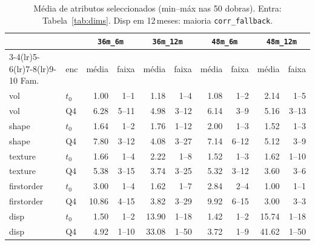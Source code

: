 \documentclass[review]{elsarticle}
\newcommand{\code}[1]{\texttt{#1}}
\begin{document}
\begin{table}[htbp]
\centering
\footnotesize
\caption{Média de atributos seleccionados (min--máx nas 50 dobras).
Entra: Tabela~\ref{tab:dims}.
Disp em 12\,meses: maioria \code{corr\_fallback}.}
\label{tab:nfeat}
\begin{tabular}{ll rr rr rr rr}
\toprule
& & \multicolumn{2}{c}{\code{36m\_6m}} & \multicolumn{2}{c}{\code{36m\_12m}} & \multicolumn{2}{c}{\code{48m\_6m}} & \multicolumn{2}{c}{\code{48m\_12m}} \\
\cmidrule(lr){3-4}\cmidrule(lr){5-6}\cmidrule(lr){7-8}\cmidrule(lr){9-10}
Fam. & enc & média & faixa & média & faixa & média & faixa & média & faixa \\
\midrule
vol & $t_0$ & 1.00 & 1--1 & 1.18 & 1--4 & 1.08 & 1--2 & 2.14 & 1--5 \\
vol & Q4 & 6.28 & 5--11 & 4.98 & 3--12 & 6.14 & 3--9 & 5.16 & 3--13 \\
shape & $t_0$ & 1.64 & 1--2 & 1.76 & 1--12 & 2.00 & 1--3 & 1.52 & 1--3 \\
shape & Q4 & 7.80 & 3--12 & 4.08 & 3--27 & 7.14 & 6--12 & 5.12 & 3--9 \\
texture & $t_0$ & 1.66 & 1--4 & 2.22 & 1--8 & 1.52 & 1--3 & 1.62 & 1--10 \\
texture & Q4 & 5.38 & 3--15 & 3.74 & 3--25 & 5.32 & 3--12 & 3.60 & 3--6 \\
firstorder & $t_0$ & 3.00 & 1--4 & 1.62 & 1--7 & 2.84 & 2--4 & 1.00 & 1--1 \\
firstorder & Q4 & 10.86 & 4--15 & 3.82 & 3--29 & 9.92 & 6--15 & 3.00 & 3--3 \\
disp & $t_0$ & 1.50 & 1--2 & 13.90 & 1--18 & 1.42 & 1--2 & 15.74 & 1--18 \\
disp & Q4 & 4.92 & 1--10 & 33.08 & 1--50 & 3.72 & 1--9 & 41.62 & 1--50 \\
\bottomrule
\end{tabular}
\end{table}
\end{document}
